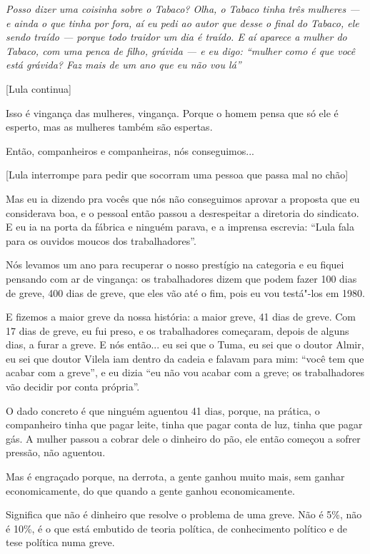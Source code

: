 \emph{Posso dizer uma coisinha sobre o Tabaco? Olha, o Tabaco tinha três
mulheres --- e ainda o que tinha por fora, aí eu pedi ao autor que desse
o final do Tabaco, ele sendo traído --- porque todo traidor um dia é
traído. E aí aparece a mulher do Tabaco, com uma penca de filho, grávida
--- e eu digo: ``mulher como é que você está grávida? Faz mais de um ano
que eu não vou lá''}

[Lula continua]

Isso é vingança das mulheres, vingança. Porque o homem pensa que
só ele é esperto, mas as mulheres também são espertas.

Então, companheiros e companheiras, nós conseguimos...

[Lula interrompe para pedir que socorram uma pessoa que passa
mal no chão]

Mas eu ia dizendo pra vocês que nós não conseguimos aprovar a
proposta que eu considerava boa, e o pessoal então passou a desrespeitar
a diretoria do sindicato. E eu ia na porta da fábrica e ninguém parava,
e a imprensa escrevia: ``Lula fala para os ouvidos moucos dos
trabalhadores''.

Nós levamos um ano para recuperar o nosso prestígio na categoria e
eu fiquei pensando com ar de vingança: os trabalhadores dizem que podem
fazer 100 dias de greve, 400 dias de greve, que eles vão até o fim, pois
eu vou testá"-los em 1980.

E fizemos a maior greve da nossa história: a maior greve, 41 dias
de greve. Com 17 dias de greve, eu fui preso, e os trabalhadores
começaram, depois de alguns dias, a furar a greve. E nós então... eu sei
que o Tuma, eu sei que o doutor Almir, eu sei que doutor Vilela iam
dentro da cadeia e falavam para mim: ``você tem que acabar com a greve'',
e eu dizia ``eu não vou acabar com a greve; os trabalhadores vão decidir
por conta própria''.

O dado concreto é que ninguém aguentou 41 dias, porque, na
prática, o companheiro tinha que pagar leite, tinha que pagar conta de
luz, tinha que pagar gás. A mulher passou a cobrar dele o dinheiro do
pão, ele então começou a sofrer pressão, não aguentou.

Mas é engraçado porque, na derrota, a gente ganhou muito mais, sem
ganhar economicamente, do que quando a gente ganhou economicamente.

Significa que não é dinheiro que resolve o problema de uma greve.
Não é 5\%, não é 10\%, é o que está embutido de teoria política, de
conhecimento político e de tese política numa greve.

